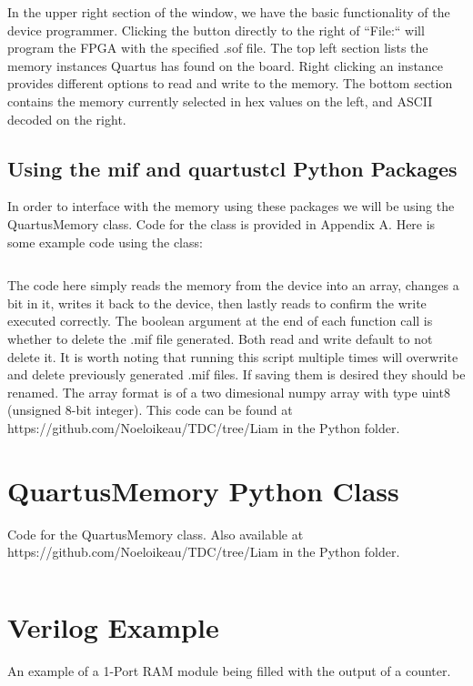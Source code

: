 \documentclass[letter,12pt]{article}
\begin{document}
In the upper right section of the window, we have the basic functionality of the device programmer. Clicking the button directly to the right of ``File:`` will program the FPGA with the specified .sof file. The top left section lists the memory instances Quartus has found on the board. Right clicking an instance provides different options to read and write to the memory. The bottom section contains the memory currently selected in hex values on the left, and ASCII decoded on the right.

\subsection{Using the mif and quartustcl Python Packages}

In order to interface with the memory using these packages we will be using the QuartusMemory class. Code for the class is provided in Appendix A. Here is some example code using the class:

\begin{mdframed}
\inputminted[linenos=true,breaklines,breakanywhere=true]{python}{../../Python/memoryExample.py}
\end{mdframed}

The code here simply reads the memory from the device into an array, changes a bit in it, writes it back to the device, then lastly reads to confirm the write executed correctly. The boolean argument at the end of each function call is whether to delete the .mif file generated. Both read and write default to not delete it. It is worth noting that running this script multiple times will overwrite and delete previously generated .mif files. If saving them is desired they should be renamed. The array format is of a two dimesional numpy array with type uint8 (unsigned 8-bit integer). 
This code can be found at https://github.com/Noeloikeau/TDC/tree/Liam in the Python folder.

\newpage
\appendix

\section{QuartusMemory Python Class}

Code for the QuartusMemory class. Also available at \\ https://github.com/Noeloikeau/TDC/tree/Liam in the Python folder.

\begin{mdframed}
\inputminted[linenos=true,breaklines,breakanywhere=true]{python}{../../Python/QuartusMemory.py}
\end{mdframed}

\section{Verilog Example}
An example of a 1-Port RAM module being filled with the output of a counter.

\begin{mdframed}
\inputminted[linenos=true,breaklines,breakanywhere=true]{verilog}{memExample.v}
\end{mdframed}
\end{document}
